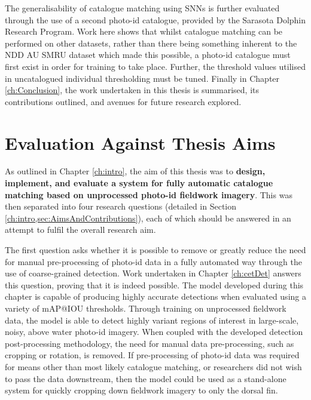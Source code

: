 The generalisability of catalogue matching using SNNs is further evaluated through the use of a second photo-id catalogue, provided by the Sarasota Dolphin Research Program. Work here shows that whilst catalogue matching can be performed on other datasets, rather than there being something inherent to the NDD AU SMRU dataset which made this possible, a photo-id catalogue must first exist in order for training to take place. Further, the threshold values utilised in uncatalogued individual thresholding must be tuned. Finally in Chapter \ref{ch:Conclusion}, the work undertaken in this thesis is summarised, its contributions outlined, and avenues for future research explored.

\section{Evaluation Against Thesis Aims}\label{ch:Conclusion,sec:AimsEvaluation}

As outlined in Chapter \ref{ch:intro}, the aim of this thesis was to \textbf{design, implement, and evaluate a system for fully automatic catalogue matching based on unprocessed photo-id fieldwork imagery}. This was then separated into four research questions (detailed in Section \ref{ch:intro,sec:AimsAndContributions}), each of which should be answered in an attempt to fulfil the overall research aim. 

The first question asks whether it is possible to remove or greatly reduce the need for manual pre-processing of photo-id data in a fully automated way through the use of coarse-grained detection. Work undertaken in Chapter \ref{ch:cetDet} answers this question, proving that it is indeed possible. The model developed during this chapter is capable of producing highly accurate detections when evaluated using a variety of mAP@IOU thresholds. Through training on unprocessed fieldwork data, the model is able to detect highly variant regions of interest in large-scale, noisy, above water photo-id imagery. When coupled with the developed detection post-processing methodology, the need for manual data pre-processing, such as cropping or rotation, is removed. If pre-processing of photo-id data was required for means other than most likely catalogue matching, or researchers did not wish to pass the data downstream, then the model could be used as a stand-alone system for quickly cropping down fieldwork imagery to only the dorsal fin. 

